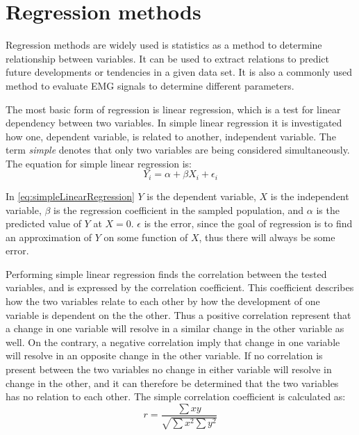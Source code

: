 \section{Regression methods}

	

Regression methods are widely used is statistics as a method to determine relationship between variables. It can be used to extract relations to predict future developments or tendencies in a given data set. It is also a commonly used method to evaluate EMG signals to determine different parameters. 

The most basic form of regression is linear regression, which is a test for linear dependency between two variables. In simple linear regression it is investigated how one, dependent variable, is related to another, independent variable. The term \textit{simple} denotes that only two variables are being considered simultaneously. The equation for simple linear regression is: \cite{zar2009}
\begin{equation} \label{eq:simpleLinearRegression}
Y_i = \alpha + \beta X_i + \epsilon_i
\end{equation}

In \eqref{eq:simpleLinearRegression} $Y$ is the dependent variable, $X$ is the independent variable, $\beta$ is the regression coefficient in the sampled population, and $\alpha$ is the predicted value of $Y$ at $X = 0$. $\epsilon$ is the error, since the goal of regression is to find an approximation of $Y$ on some function of $X$, thus there will always be some error.

Performing simple linear regression finds the correlation between the tested variables, and is expressed by the correlation coefficient. This coefficient describes how the two variables relate to each other by how the development of one variable is dependent on the the other. Thus a positive correlation represent that a change in one variable will resolve in a similar change in the other variable as well. On the contrary, a negative correlation imply that change in one variable will resolve in an opposite change in the other variable. If no correlation is present between the two variables no change in either variable will resolve in change in the other, and it can therefore be determined that the two variables has no relation to each other. \cite{zar2009}
The simple correlation coefficient is calculated as: \cite{zar2009}
\begin{equation}
r = \frac{\sum xy}{\sqrt{\sum x^{2} \sum y^{2}}}
\end{equation}

